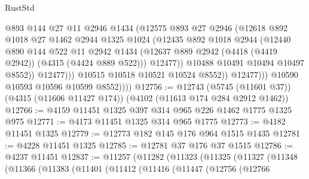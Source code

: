 \begin{lexlean}{RustStd}
\begin{coremodule}
                            @893
                            @144
                            @27
                            @11
                            @2946
                            @1434
                            (@12575
                              @893
                              @27
                              @2946
                              (@12618
                                @892
                                @1018
                                @27
                                @1462
                                @2944
                                @1325
                                @1024
                                (@12435
                                  @892
                                  @1018
                                  @2944
                                  (@12440
                                    @890
                                    @144
                                    @522
                                    @11
                                    @2942
                                    @1434
                                    (@12637
                                      @889
                                      @2942
                                      (@4418 (@4419 @2942))
                                      (@4315 (@4424 @889 @522)))
                                    @12477))
                                @10488
                                @10491
                                @10494
                                @10497
                                @8552))
                            @12477)))
                      @10515
                      @10518
                      @10521
                      @10524
                      @8552))
                  @12477)))
            @10590
            @10593
            @10596
            @10599
            @8552))))
@12756 := @12743
    (@5745 (@11601 @37))
    (@4315 (@11606 @11427 @174))
    (@4102 (@11613 @174 @284 @2912 @1462))
@12766 := @4159 @11451 @1325 @397 @314 @965 @226 @1462 @1775 @1325 @975
@12771 := @4173 @11451 @1325 @314 @965 @1775
@12773 := @4182 @11451 @1325
@12779 := @12773 @182 @145 @176 @964 @1515 @1435
@12781 := @4228 @11451 @1325
@12785 := @12781 @37 @176 @37 @1515
@12786 := @4237 @11451
@12837 := @11257
    (@11282
      (@11323
        (@11325
          (@11327
            (@11348
              (@11366
                (@11383
                  (@11401
                    (@11412
                      (@11416
                        (@11447
                          (@12756
                            (@12766

\end{coremodule}
\end{lexlean}

